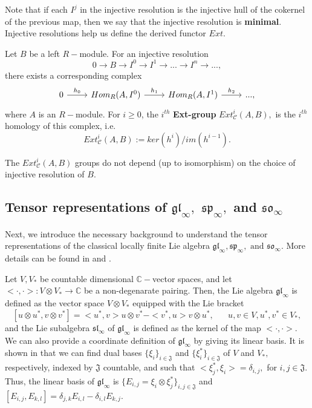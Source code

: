 \documentclass[main.tex]{subfiles}
\begin{document}
 Note that if each $I^j$ in the injective resolution is the injective hull of the cokernel of the previous map, then we say that the injective resolution is \textbf{minimal}.\\

 Injective resolutions help us define the derived functor $Ext.$

 \begin{defn}
 Let $B$ be a left $R-$module. For an injective resolution
 $$0\to B \to I^0\to I^1 \to ... \to I^n \to ...,$$
 there exists a corresponding complex
 $$
 \begin{tikzcd}
     0 \arrow{r}{h_0} &
     Hom_R(A, I^0) \arrow{r}{h_1}&  
     Hom_R(A, I^1) \arrow{r}{h_2}& ... ,
 \end{tikzcd}
 $$
 where $A$ is an $R-$module.
 For $i\geq 0$, the $i^{th}$ \textbf{Ext-group} $ Ext_\mathcal{C}^i(A,B),$ is the $i^{th}$ homology of this complex, i.e.
 $$
 Ext_\mathcal{C}^i(A,B) := ker(h^i) / im(h^{i-1}).
 $$     
 \end{defn}
 \bigskip
 \begin{prop}
     The $ Ext_\mathcal{C}^i(A,B)$ groups do not depend (up to isomorphism) on the choice of injective resolution of $B$.
 \end{prop}
\bigskip



\subsection{Tensor representations of $\mathfrak{gl}_\infty,$ $\mathfrak{sp}_\infty,$ and $\mathfrak{so}_\infty$}

Next, we introduce the necessary background to understand the tensor representations of the classical locally finite Lie algebra $\mathfrak{gl}_\infty, \mathfrak{sp}_\infty,\text{ and } \mathfrak{so}_\infty$. More details can be found in \cite{penkov2007tensorrepresentationsclassicallocally} and \cite{dancohen2012koszulcategoryrepresentationsfinitary}. \\
\bigskip

Let $V, V_*$ be countable dimensional $\mathbb{C}-$vector spaces, and let $<\cdot, \cdot>:V\otimes V_{*}\to \mathbb{C}$ be a non-degenarate pairing. Then, the Lie algebra $\mathfrak{gl}_\infty$ is defined as the vector space $V\otimes V_{*}$ equipped with the Lie bracket
$$[u\otimes u^*, v\otimes v^*] = <u^{*}, v>u\otimes v^{*} - <v^{*},u>v\otimes u^{*}, \;\;\;\;\;\; u,v\in V, u^{*}, v^{*}\in V_{*},$$
and the Lie subalgebra $\mathfrak{sl}_\infty$ of $\mathfrak{gl}_\infty$ is defined as the kernel of the map $<\cdot,\cdot>$.
We can also provide a coordinate definition of $\mathfrak{gl}_\infty$ by giving its linear basis. It is shown in \cite{Mackey} that we can find dual bases $\{\xi_i\}_{i\in\mathfrak{J}}$ and $\{\xi_i^*\}_{i\in\mathfrak{J}}$ of $V$ and $V_*,$ respectively, indexed by $\mathfrak{J}$ countable, and such that $<\xi_j^*, \xi_i> = \delta_{i,j},$ for $i,j\in\mathfrak{J}.$ Thus, the linear basis of $\mathfrak{gl}_\infty$ is $\{E_{i,j}=\xi_i\otimes\xi_j^*\}_{i,j\in\mathfrak{J}}$ and $[E_{i,j}, E_{k,l}] = \delta_{j,k}E_{i,l}-\delta_{i,l}E_{k,j}.$\\
\end{document}
